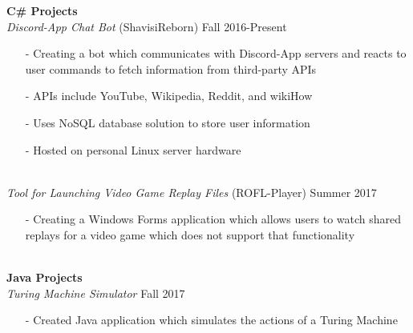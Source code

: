 \documentclass[10pt]{article}
\newcommand{\Indent}{\indent\indent}
\begin{document}
        \indent \small\textbf{C\# Projects}\\
            \Indent \small\textit{Discord-App Chat Bot}\small{ (ShavisiReborn)} \hfill \small{Fall 2016-Present}\indent\\
                \Indent\begin{minipage}{\dimexpr\textwidth-6cm}
                    \begin{itemize}[noitemsep, topsep=0pt]
                        \item[-] Creating a bot which communicates with Discord-App servers and reacts to user commands to fetch information from third-party APIs
                        \item[-] APIs include YouTube, Wikipedia, Reddit, and wikiHow
                        \item[-] Uses NoSQL database solution to store user information
                        \item[-] Hosted on personal Linux server hardware
                    \end{itemize}\vspace{0mm}
                \end{minipage}\\
            \Indent \small\textit{Tool for Launching Video Game Replay Files}\small{ (ROFL-Player)} \hfill \small{Summer 2017}\indent\vspace{0.5mm}\\
                \Indent\begin{minipage}{\dimexpr\textwidth-6cm}
                    \begin{itemize}[noitemsep, topsep=0pt]
                        \item[-] Creating a Windows Forms application which allows users to watch shared replays for a video game which does not support that functionality
                    \end{itemize}\vspace{0mm}
                \end{minipage}\\
        \indent \small\textbf{Java Projects}\\
            \Indent \small\textit{Turing Machine Simulator} \hfill \small{Fall 2017}\indent\\
                \Indent\begin{minipage}{\dimexpr\textwidth-6cm}
                    \begin{itemize}[noitemsep, topsep=0pt]
                        \item[-] Created Java application which simulates the actions of a Turing Machine
                    \end{itemize}\vspace{0mm}
                \end{minipage}\\
\end{document}
